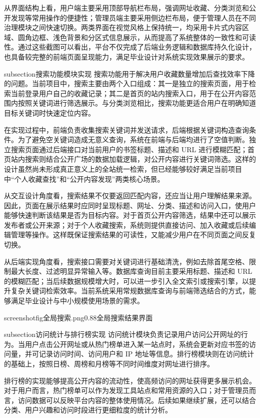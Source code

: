 从界面结构上看，用户端主要采用顶部导航栏布局，强调网址收藏、分类浏览和公开发现等常用操作的便捷性；管理员端主要采用侧边栏布局，便于管理人员在不同治理模块之间快速切换。两类界面在视觉风格上保持统一，均采用卡片式内容区域、圆角边框、浅色背景和分区式信息展示，从而提高了系统整体的一致性和可读性。通过这些截图可以看出，平台不仅完成了后端业务逻辑和数据库持久化设计，也具备较完整的前端页面呈现能力，满足毕业设计对系统实现效果展示的要求。



subsection{搜索功能模块实现}
搜索功能用于解决用户收藏数量增加后查找效率下降的问题。当前项目中，搜索主要由两个入口组成：其一是独立的搜索页面，用于检索当前登录用户自己的收藏记录；其二是首页的站内搜索入口，用于在公开内容范围内按照关键词进行筛选展示。与分类浏览相比，搜索功能更适合用户在明确知道目标关键词时快速定位内容。

在实现过程中，前端负责收集搜索关键词并发送请求，后端根据关键词构造查询条件。为了避免空关键词造成无意义查询，系统在前端与后端均进行了空值判断。独立搜索页面通过后端接口对当前用户的书签标题、描述和 URL 进行模糊匹配；首页站内搜索则结合公开广场的数据加载逻辑，对公开内容进行关键词筛选。这样的设计虽然尚未形成真正意义上的全站统一检索，但已经能够较好满足当前项目中“个人收藏查找”和“公开内容发现”两类核心场景。

从交互设计角度看，搜索结果不仅要返回匹配内容，还应当让用户理解结果来源。因此，页面在展示结果时应同时呈现标题、网址、分类、描述和访问入口，使用户能够快速判断该结果是否为目标内容。对于首页公开内容筛选，结果中还可以展示发布者或公开来源；对于个人收藏搜索，系统则提供直接访问、加入收藏或后续编辑管理等操作。这样既保证搜索结果的可读性，又能减少用户在不同页面之间反复切换。

从后端实现角度看，搜索接口需要对关键词进行基础清洗，例如去除首尾空格、限制最大长度、过滤明显异常输入等。数据库查询目前主要采用标题、描述和 URL 的模糊匹配；当后续数据规模增大时，可以进一步引入全文索引或搜索引擎，以提升复杂关键词检索效率。当前系统采用常规数据库查询与前端筛选结合的方式，能够满足毕业设计与中小规模使用场景的需求。

screenshotfig{全局搜索.png}{0.88}{全局搜索结果界面}

subsection{访问统计与排行榜实现}
访问统计模块负责记录用户访问公开网址的行为。当用户点击公开网址或从热门榜单进入某一站点时，系统会更新对应书签的访问量，并可记录访问时间、访问用户和 IP 地址等信息。排行榜模块则在访问统计的基础上，按照日榜、周榜和月榜等不同时间维度对网址进行排序。

排行榜的实现能够提高公开内容的流动性，使高频访问的网址获得更多展示机会。对于用户而言，热门榜单可以作为发现工具站点和常用资源的入口；对于管理员而言，访问数据可以反映平台内容的整体使用情况。后续如果继续扩展，还可以结合分类、用户兴趣和访问时段进行更细粒度的统计分析。

